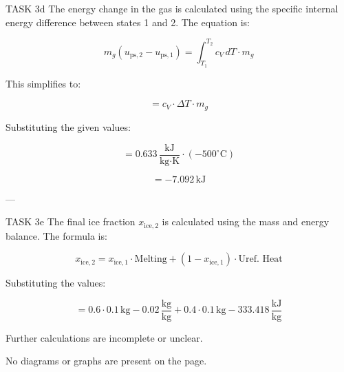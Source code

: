 TASK 3d  
The energy change in the gas is calculated using the specific internal energy difference between states 1 and 2. The equation is:  

\[
m_g \left( u_{\text{ps},2} - u_{\text{ps},1} \right) = \int_{T_1}^{T_2} c_V \, dT \cdot m_g
\]

This simplifies to:  

\[
= c_V \cdot \Delta T \cdot m_g
\]

Substituting the given values:  

\[
= 0.633 \, \frac{\text{kJ}}{\text{kg·K}} \cdot (-500^\circ\text{C})
\]

\[
= -7.092 \, \text{kJ}
\]

---

TASK 3e  
The final ice fraction \( x_{\text{ice},2} \) is calculated using the mass and energy balance. The formula is:  

\[
x_{\text{ice},2} = x_{\text{ice},1} \cdot \text{Melting} + (1 - x_{\text{ice},1}) \cdot \text{Uref. Heat}
\]

Substituting the values:  

\[
= 0.6 \cdot 0.1 \, \text{kg} - 0.02 \, \frac{\text{kg}}{\text{kg}} + 0.4 \cdot 0.1 \, \text{kg} - 333.418 \, \frac{\text{kJ}}{\text{kg}}
\]  

Further calculations are incomplete or unclear.  

No diagrams or graphs are present on the page.